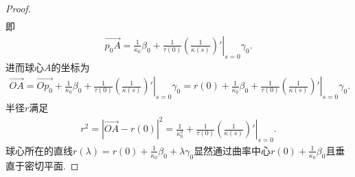 \documentclass[../../main.tex]{subfiles}%
\begin{document}
\begin{proof}
\begin{align*}
\end{align*}
即
\begin{align*}
\overrightarrow{p_0A}=\frac{1}{\kappa _0}\beta _0+\frac{1}{\tau \left( 0 \right)}\left. \left( \frac{1}{\kappa \left( s \right)} \right) ' \right|_{s=0}\gamma _0.
\end{align*}
进而球心$A$的坐标为
\begin{align*}
\overrightarrow{OA}=\overrightarrow{Op_0}+\frac{1}{\kappa _0}\beta _0+\frac{1}{\tau \left( 0 \right)}\left. \left( \frac{1}{\kappa \left( s \right)} \right) ' \right|_{s=0}\gamma _0=r\left( 0 \right) + \frac{1}{\kappa _0}\beta _0+\frac{1}{\tau \left( 0 \right)}\left. \left( \frac{1}{\kappa \left( s \right)} \right) ' \right|_{s=0}\gamma _0.
\end{align*}
半径$r$满足
\begin{align*}
r^2=|\overrightarrow{OA}-r(0)|^2=\frac{1}{\kappa _{0}^{2}}+\frac{1}{\tau \left( 0 \right)}\left. \left( \frac{1}{\kappa \left( s \right)} \right) \prime \right|_{s=0}.
\end{align*}
球心所在的直线$r(\lambda)=r(0)+\frac{1}{\kappa_0}\beta_0+\lambda\gamma_0$显然通过曲率中心$r(0)+\frac{1}{\kappa_0}\beta_0$且垂直于密切平面.
\end{proof}
\end{document}
